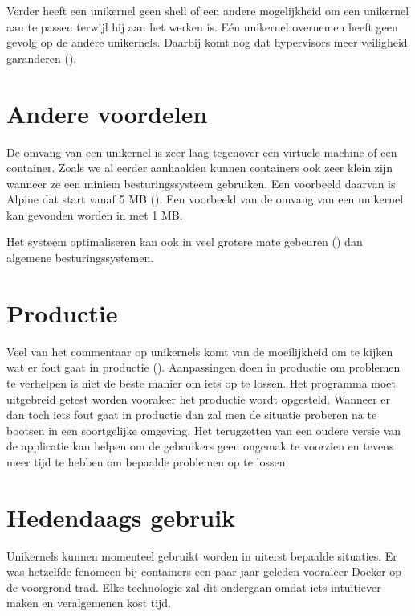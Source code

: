 \documentclass[pdftex,a4paper,12pt,twoside]{report}
\begin{document}
Verder heeft een unikernel geen shell of een andere mogelijkheid om een unikernel aan te passen terwijl hij aan het werken is. Eén unikernel overnemen heeft geen gevolg op de andere unikernels. Daarbij komt nog dat hypervisors meer veiligheid garanderen (\cite{colp_breaking_2011}).

\section{Andere voordelen}

De omvang van een unikernel is zeer laag tegenover een virtuele machine of een container. Zoals we al eerder aanhaalden kunnen containers ook zeer klein zijn wanneer ze een miniem besturingssysteem gebruiken. Een voorbeeld daarvan is Alpine dat start vanaf 5 MB (\cite{_gliderlabs/docker-alpine_????}).
Een voorbeeld van de omvang van een unikernel kan gevonden worden in \cite[hoofdstuk 4, p.~10]{madhavapeddy_jitsu:_2015} met 1 MB.

Het systeem optimaliseren kan ook in veel grotere mate gebeuren (\cite{madhavapeddy_turning_2010}) dan algemene besturingssystemen.

\section{Productie}

Veel van het commentaar op unikernels komt van de moeilijkheid om te kijken wat er fout gaat in productie (\cite{bryan_cantrill_unikernels_2016}). Aanpassingen doen in productie om problemen te verhelpen is niet de beste manier om iets op te lossen. Het programma moet uitgebreid getest worden vooraleer het productie wordt opgesteld. Wanneer er dan toch iets fout gaat in productie dan zal men de situatie proberen na te bootsen in een soortgelijke omgeving. Het terugzetten van een oudere versie van de applicatie kan helpen om de gebruikers geen ongemak te voorzien en tevens meer tijd te hebben om bepaalde problemen op te lossen.

\section{Hedendaags gebruik}

Unikernels kunnen momenteel gebruikt worden in uiterst bepaalde situaties. Er was hetzelfde fenomeen bij containers een paar jaar geleden vooraleer Docker op de voorgrond trad. Elke technologie zal dit ondergaan omdat iets intuïtiever maken en veralgemenen kost tijd.
\end{document}
